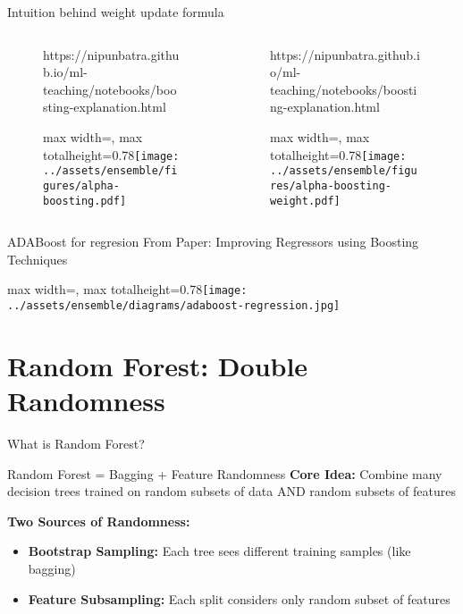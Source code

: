 \documentclass[10pt]{beamer}
\newcommand{\fitpic}[1]{\begin{adjustbox}{max width=\linewidth, max totalheight=0.78\textheight}#1\end{adjustbox}}
\begin{document}
\begin{frame}{Intuition behind weight update formula}
  \begin{columns}
    \pause \begin{column}{0.5\textwidth}

      \begin{figure}[htp]
        \centering
        \begin{notebookbox}{https://nipunbatra.github.io/ml-teaching/notebooks/boosting-explanation.html}
          \fitpic{\texttt{[image: ../assets/ensemble/figures/alpha-boosting.pdf]}}
        \end{notebookbox}
      \end{figure}
    \end{column}
    \pause \begin{column}{0.5\textwidth}
      \begin{figure}[htp]
        \centering
        \begin{notebookbox}{https://nipunbatra.github.io/ml-teaching/notebooks/boosting-explanation.html}
          \fitpic{\texttt{[image: ../assets/ensemble/figures/alpha-boosting-weight.pdf]}}
        \end{notebookbox}
      \end{figure}
    \end{column}
  \end{columns}


\end{frame}

\begin{frame}{ADABoost for regresion}
  From Paper: Improving Regressors using Boosting Techniques

  \fitpic{\texttt{[image: ../assets/ensemble/diagrams/adaboost-regression.jpg]}}
  
\end{frame}

\section{Random Forest: Double Randomness}

\begin{frame}{What is Random Forest?}
\begin{definitionbox}{Random Forest = Bagging + Feature Randomness}
\textbf{Core Idea:} Combine many decision trees trained on random subsets of data AND random subsets of features
\end{definitionbox}

\begin{keypointsbox}
\textbf{Two Sources of Randomness:}
\begin{itemize}
\item \textbf{Bootstrap Sampling:} Each tree sees different training samples (like bagging)
\item \textbf{Feature Subsampling:} Each split considers only random subset of features
\end{itemize}
\end{keypointsbox}
\end{frame}
\end{document}
